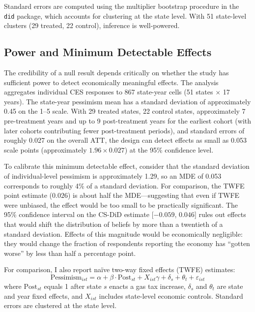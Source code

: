 \documentclass[12pt]{article}
\begin{document}
Standard errors are computed using the multiplier bootstrap procedure in the \texttt{did} package, which accounts for clustering at the state level. With 51 state-level clusters (29 treated, 22 control), inference is well-powered.

\subsection{Power and Minimum Detectable Effects}

The credibility of a null result depends critically on whether the study has sufficient power to detect economically meaningful effects. The analysis aggregates individual CES responses to 867 state-year cells (51 states $\times$ 17 years). The state-year pessimism mean has a standard deviation of approximately 0.45 on the 1--5 scale. With 29 treated states, 22 control states, approximately 7 pre-treatment years and up to 9 post-treatment years for the earliest cohort (with later cohorts contributing fewer post-treatment periods), and standard errors of roughly 0.027 on the overall ATT, the design can detect effects as small as 0.053 scale points (approximately $1.96 \times 0.027$) at the 95\% confidence level.

To calibrate this minimum detectable effect, consider that the standard deviation of individual-level pessimism is approximately 1.29, so an MDE of 0.053 corresponds to roughly 4\% of a standard deviation. For comparison, the TWFE point estimate ($0.026$) is about half the MDE---suggesting that even if TWFE were unbiased, the effect would be too small to be practically significant. The 95\% confidence interval on the CS-DiD estimate [$-0.059$, $0.046$] rules out effects that would shift the distribution of beliefs by more than a twentieth of a standard deviation. Effects of this magnitude would be economically negligible: they would change the fraction of respondents reporting the economy has ``gotten worse'' by less than half a percentage point.

For comparison, I also report na\"ive two-way fixed effects (TWFE) estimates:
\begin{equation}
\text{Pessimism}_{ist} = \alpha + \beta \cdot \text{Post}_{st} + X_{ist}\gamma + \delta_s + \theta_t + \varepsilon_{ist}
\end{equation}
where $\text{Post}_{st}$ equals 1 after state $s$ enacts a gas tax increase, $\delta_s$ and $\theta_t$ are state and year fixed effects, and $X_{ist}$ includes state-level economic controls. Standard errors are clustered at the state level.
\end{document}
